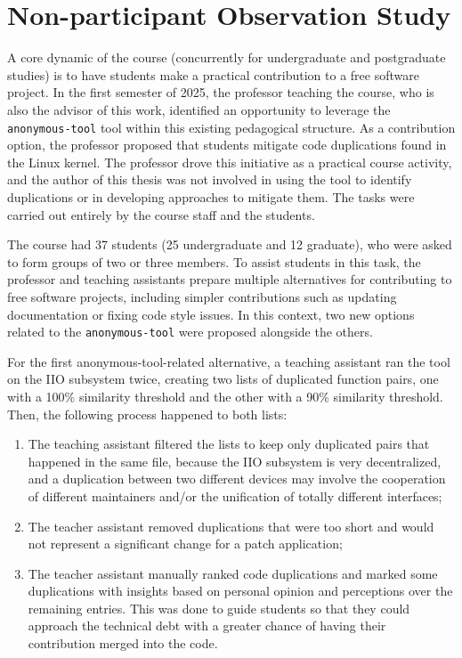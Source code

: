 \documentclass[10pt,conference]{IEEEtran}
\begin{document}
\section{Non-participant Observation Study}

A core dynamic of the course (concurrently for undergraduate and postgraduate studies) is to have students make a practical contribution to a free software project. In the first semester of 2025, the professor teaching the course, who is also the advisor of this work, identified an opportunity to leverage the \texttt{anonymous-tool} tool within this existing pedagogical structure. As a contribution option, the professor proposed that students mitigate code duplications found in the Linux kernel. The professor drove this initiative as a practical course activity, and the author of this thesis was not involved in using the tool to identify duplications or in developing approaches to mitigate them. The tasks were carried out entirely by the course staff and the students.

The course had 37 students (25 undergraduate and 12 graduate), who were asked to form groups of 
two or three members. To assist students in this task, the professor and teaching assistants prepare multiple 
alternatives for contributing to free software projects, including simpler contributions such as 
updating documentation or fixing code style issues. In this context, two new options related to the 
\texttt{anonymous-tool} were proposed alongside the others.

For the first anonymous-tool-related alternative, a teaching assistant ran the tool on the IIO subsystem twice, creating two lists of duplicated function pairs, one with a 100\% similarity threshold and the other with a 90\% similarity threshold. Then, the following process happened to both lists:

\begin{enumerate}
    \item The teaching assistant filtered the lists to keep only duplicated pairs that happened in the same file, because the IIO subsystem is very decentralized, and a duplication between two different devices may involve the cooperation of different maintainers and/or the unification of totally different interfaces;
    \item The teacher assistant removed duplications that were too short and would not represent a significant change for a patch application;
    \item The teacher assistant manually ranked code duplications and marked some duplications with insights based on personal opinion and perceptions over the remaining entries. This was done to guide students so that they could approach the technical debt with a greater chance of having their contribution merged into the code.
\end{enumerate}
\end{document}
